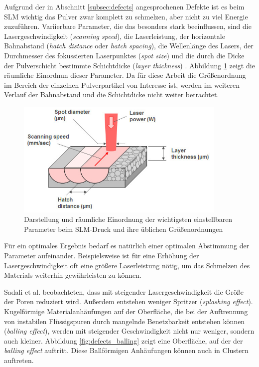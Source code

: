 		Aufgrund der in Abschnitt \ref{subsec:defects} angesprochenen Defekte ist es beim
		SLM wichtig das Pulver zwar komplett zu schmelzen, aber nicht zu viel Energie zuzuführen.
		Variierbare Parameter, die das besonders stark beeinflussen, sind die Lasergeschwindigkeit
		(\emph{scanning speed}), die Laserleistung, der horizontale Bahnabstand
		(\emph{hatch distance} oder \emph{hatch spacing}), die Wellenlänge des Lasers, der
		Durchmesser des fokussierten Laserpunktes (\emph{spot size}) und die durch die Dicke der
		Pulverschicht bestimmte  Schichtdicke (\emph{layer thickness}) \cite{sadali2020influence}.
		Abbildung \ref{fig:slm_parameters} zeigt die räumliche Einordnun dieser Parameter. Da für
		diese Arbeit die Größenordnung im Bereich der einzelnen Pulverpartikel von Interesse ist,
		werden im weiteren Verlauf der Bahnabstand und die Schichtdicke nicht weiter betrachtet.

		\begin{figure}[!ht]
			\centering
			\includegraphics[width=0.9\textwidth]{chapter/main/theory/img/slm_parameters.jpg}
			\caption{Darstellung und räumliche Einordnung der wichtigsten einstellbaren Parameter
			beim SLM-Druck und ihre üblichen Größenordnungen \cite{saunders2017x}}
			\label{fig:slm_parameters}
		\end{figure}

		Für ein optimales Ergebnis bedarf es natürlich einer optimalen Abstimmung der Parameter
		aufeinander. Beispielsweise ist für eine Erhöhung der Lasergeschwindigkeit oft eine
		größere Laserleistung nötig, um das Schmelzen des Materials weiterhin gewährleisten
		zu können.

		Sadali et al. beobachteten, dass mit steigender Lasergeschwindigkeit die Größe der Poren
		reduziert wird. Außerdem entstehen weniger Spritzer (\emph{splashing effect}).
		Kugelförmige Materialanhäufungen auf der Oberfläche, die bei der Auftrennung von
		instabilen Flüssigspuren durch mangelnde Benetzbarkeit entstehen können
		(\emph{balling effect}), werden mit steigender Geschwindigkeit nicht nur weniger, sondern
		auch kleiner. Abbildung \ref{fig:defects_balling} zeigt eine Oberfläche, auf der der
		\emph{balling effect} auftritt. Diese Ballförmigen Anhäufungen können auch in Clustern
		auftreten.

